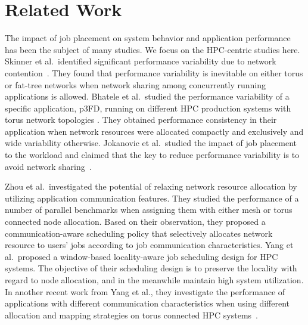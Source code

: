 \section{Related Work}
\label{sec:related work}

The impact of job placement on system behavior and application performance has been the subject of many studies.
We focus on the HPC-centric studies here. Skinner et al.\ identified significant performance variability due to network contention~\cite{dskinner}. They found that performance variability is inevitable on either torus or fat-tree networks when network sharing among concurrently running applications is allowed.
Bhatele et al.\ studied the performance variability of a specific application, p3FD, running on different HPC production systems with torus network topologies \cite{abhinav-sc13}. They obtained performance consistency in their application when network resources were allocated compactly and exclusively and wide variability otherwise. Jokanovic et al.\ studied the impact of job placement to the workload and claimed that the key to reduce performance variability is to avoid network sharing~\cite{jose-ipdps15}. 

Zhou et al.\ investigated the potential of relaxing network resource allocation by utilizing application communication features\cite{zhou-ipdps-2015}. They studied the performance of a number of parallel benchmarks when assigning them with either mesh or torus connected node allocation. Based on their observation, they proposed a communication-aware scheduling policy that selectively allocates network resource to users’ jobs according to job communication characteristics. Yang et al.\ proposed a window-based locality-aware job scheduling design for HPC systems\cite{Yang-Cluster14}. The objective of their scheduling design is to preserve the locality with regard to node allocation, and in the meanwhile maintain high system utilization. In another recent work from Yang et al., they investigate the performance of applications with different communication characteristics when using different allocation and mapping strategies on torus connected HPC systems~\cite{Yang-ICPADS16}.

